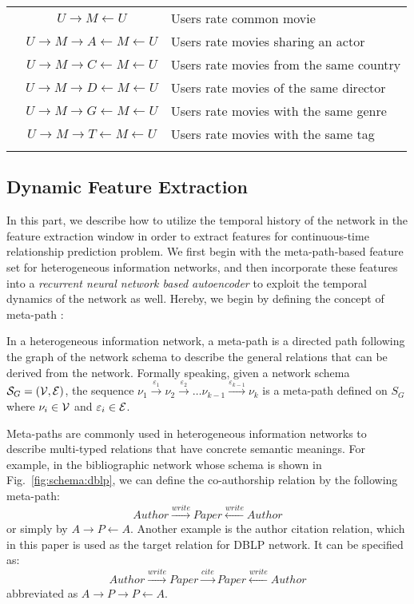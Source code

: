 \begin{table}[t]
\begin{tabular} {c c l}
        & $U\rightarrow M\leftarrow U$ & Users rate common movie\\
        & $U\rightarrow M\rightarrow A\leftarrow M\leftarrow U$ & Users rate movies sharing an actor\\
        & $U\rightarrow M\rightarrow C\leftarrow M\leftarrow U$ & Users rate movies from the same country\\
        & $U\rightarrow M\rightarrow D\leftarrow M\leftarrow U$ & Users rate movies of the same director\\
        & $U\rightarrow M\rightarrow G\leftarrow M\leftarrow U$ & Users rate movies with the same genre\\
        & $U\rightarrow M\rightarrow T\leftarrow M\leftarrow U$ & Users rate movies with the same tag\\
        &&\\
        \bottomrule
    \end{tabular}
\end{table}

\subsection{Dynamic Feature Extraction}
In this part, we describe how to utilize the temporal history of the network in the feature extraction window in order to extract features for continuous-time relationship prediction problem. We first begin with the meta-path-based feature set for heterogeneous information networks, and then incorporate these features into a \emph{recurrent neural network based autoencoder} to exploit the temporal dynamics of the network as well. Hereby, we begin by defining the concept of meta-path \cite{sun2011pathsim}:

\begin{definition}
    In a heterogeneous information network, a meta-path is a directed path following the graph of the network schema to describe the general relations that can be derived from the network. Formally speaking, given a network schema $\mathcal{S}_G=(\mathcal{V}, \mathcal{E})$, the sequence $\nu_1\xrightarrow{\varepsilon_1}\nu_2\xrightarrow{\varepsilon_2}\dots\nu_{k-1}\xrightarrow{\varepsilon_{k-1}}\nu_k$ is a meta-path defined on $S_G$ where $\nu_i\in \mathcal{V}$ and $\varepsilon_i\in \mathcal{E}$.
\end{definition} 

Meta-paths are commonly used in heterogeneous information networks to describe multi-typed relations that have concrete semantic meanings. For example, in the bibliographic network whose schema is shown in Fig.~\ref{fig:schema:dblp}, we can define the co-authorship relation by the following meta-path:
\[Author\xrightarrow{write}Paper\xleftarrow{write}Author\]
or simply by $A\rightarrow P\leftarrow A$. Another example is the author citation relation, which in this paper is used as the target relation for DBLP network. It can be specified as:
\[Author\xrightarrow{write}Paper\xrightarrow{cite}Paper\xleftarrow{write}Author\]
abbreviated as $A\rightarrow P\rightarrow P\leftarrow A$.


